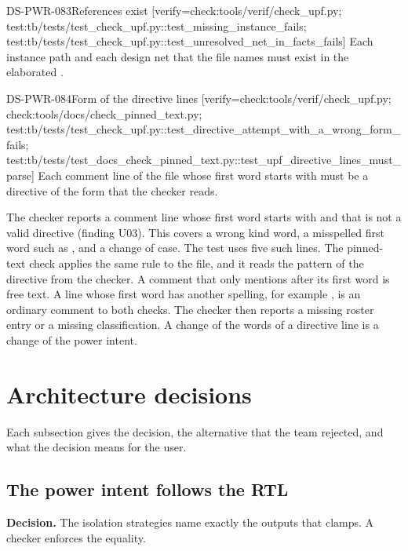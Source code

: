 \begin{requirement}{DS-PWR-083}{References exist}
[verify={check:tools/verif/check_upf.py; test:tb/tests/test_check_upf.py::test_missing_instance_fails; test:tb/tests/test_check_upf.py::test_unresolved_net_in_facts_fails}]
Each instance path and each design net that the file names must exist in the elaborated .
\end{requirement}

\begin{requirement}{DS-PWR-084}{Form of the directive lines}
[verify={check:tools/verif/check_upf.py; check:tools/docs/check_pinned_text.py; test:tb/tests/test_check_upf.py::test_directive_attempt_with_a_wrong_form_fails; test:tb/tests/test_docs_check_pinned_text.py::test_upf_directive_lines_must_parse}]
Each comment line of the file whose first word starts with  must be a directive of the form that the checker reads.
\end{requirement}
\begin{information}
The checker reports a comment line whose first word starts with  and that is not a valid directive (finding U03). This covers a wrong kind word, a misspelled first word such as , and a change of case. The test uses five such lines. The pinned-text check applies the same rule to the file, and it reads the pattern of the directive from the checker. A comment that only mentions  after its first word is free text. A line whose first word has another spelling, for example , is an ordinary comment to both checks. The checker then reports a missing roster entry or a missing classification. A change of the words of a directive line is a change of the power intent.
\end{information}

\section{Architecture decisions}\label{ds:ch:power-intent:decisions}
Each subsection gives the decision, the alternative that the team rejected, and what the decision means for the user.

\subsection{The power intent follows the RTL}\label{ds:ch:power-intent:dec-follow}
\textbf{Decision.} The isolation strategies name exactly the outputs that  clamps. A checker enforces the equality.

